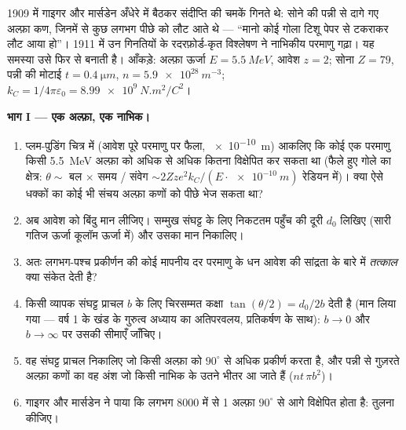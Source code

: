 \begin{problem}\label{pb:b3:scattering-theory:1}
1909 में गाइगर और मार्सडेन अँधेरे में बैठकर संदीप्ति की चमकें गिनते
थे: सोने की पन्नी से दागे गए अल्फ़ा कण, जिनमें से कुछ लगभग पीछे को
लौट आते थे --- ``मानो कोई गोला टिशू पेपर से टकराकर लौट आया हो''।
1911 में उन गिनतियों के रदरफ़ोर्ड-कृत विश्लेषण ने नाभिकीय परमाणु
गढ़ा। यह समस्या उसे फिर से बनाती है। आँकड़े: अल्फ़ा ऊर्जा $E =
\qty{5.5}{MeV}$, आवेश $z = 2$; सोना $Z = 79$, पन्नी की मोटाई $t
= \qty{0.4}{\micro m}$, $n = \qty{5.9e28}{m^{-3}}$; $k_C =
1/4\pi\varepsilon_0 = \qty{8.99e9}{N.m^2/C^2}$।

\medskip\noindent\textbf{भाग I --- एक अल्फ़ा, एक नाभिक।}
\begin{enumerate}
  \item प्लम-पुडिंग चित्र में (आवेश पूरे परमाणु पर फैला,
        \qty{e-10}{m}) आकलिए कि कोई एक परमाणु किसी \qty{5.5}{MeV}
        अल्फ़ा को अधिक से अधिक कितना विक्षेपित कर सकता था (फैले हुए
        गोले का क्षेत्र: $\theta \sim$ बल $\times$ समय / संवेग
        $\sim 2Zze^2k_C/(E\cdot\qty{e-10}{m})$ रेडियन में)। क्या
        ऐसे धक्कों का कोई भी संचय अल्फ़ा कणों को पीछे भेज सकता था?
  \item अब आवेश को बिंदु मान लीजिए। सम्मुख संघट्ट के लिए निकटतम
        पहुँच की दूरी $d_0$ लिखिए (सारी गतिज ऊर्जा कूलॉम ऊर्जा में)
        और उसका मान निकालिए।
  \item अतः लगभग-पश्च प्रकीर्णन की कोई मापनीय दर परमाणु के धन आवेश
        की सांद्रता के बारे में \emph{तत्काल} क्या संकेत देती है?
  \item किसी व्यापक संघट्ट प्राचल $b$ के लिए चिरसम्मत कक्षा
        $\tan(\theta/2) = d_0/2b$ देती है (मान लिया गया --- वर्ष 1
        के खंड के गुरुत्व अध्याय का अतिपरवलय, प्रतिकर्षण के साथ):
        $b \to 0$ और $b \to
        \infty$ पर उसकी सीमाएँ जाँचिए।
  \item वह संघट्ट प्राचल निकालिए जो किसी अल्फ़ा को $90^\circ$ से
        अधिक प्रकीर्ण करता है, और पन्नी से गुज़रते अल्फ़ा कणों का वह
        अंश जो किसी नाभिक के उतने भीतर आ जाते हैं ($n t\,\pi
        b^2$)।
  \item गाइगर और मार्सडेन ने पाया कि लगभग 8000 में से 1 अल्फ़ा
        $90^\circ$ से आगे विक्षेपित होता है: तुलना कीजिए।
\end{enumerate}


\end{problem}
